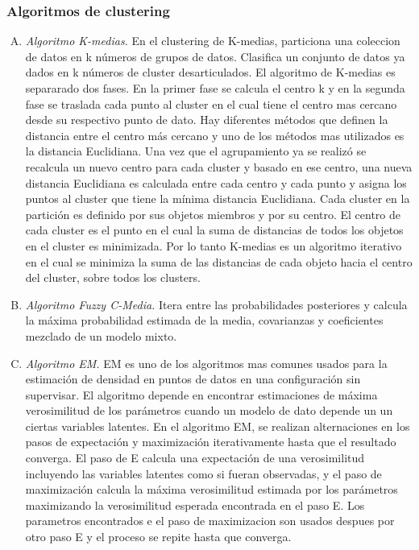 \documentclass[12pt]{report}
\begin{document}
\subsubsection{Algoritmos de clustering}
\begin{enumerate}[A.]
\item \textit{Algoritmo K-medias.} En el clustering de K-medias, particiona una coleccion de datos en k números de grupos de datos. Clasifica un conjunto de datos ya dados en k números de cluster desarticulados. El algoritmo de K-medias es separarado dos fases.
En la primer fase se calcula el centro k y en la segunda fase se traslada cada punto al cluster en el cual tiene el centro mas cercano desde su respectivo punto de dato. Hay diferentes métodos que definen la distancia entre el centro más cercano y uno de los métodos mas utilizados es la distancia Euclidiana. Una vez que el agrupamiento ya se realizó se recalcula un nuevo centro para cada cluster y basado en ese centro, una nueva distancia Euclidiana es calculada entre cada centro y cada punto y asigna los puntos al cluster que tiene la mínima distancia Euclidiana.
Cada cluster en la partición es definido por sus objetos miembros y por su centro. El centro de cada cluster es el punto en el cual la suma de distancias de todos los objetos en el cluster es minimizada. Por lo tanto K-medias es un algoritmo iterativo en el cual se minimiza la suma de las distancias de cada objeto hacia el centro del cluster, sobre todos los clusters.\cite{kmed}

\item \textit{Algoritmo Fuzzy C-Media.} Itera entre las probabilidades posteriores y calcula la máxima probabilidad estimada de la media, covarianzas y coeficientes mezclado de un modelo mixto.

\item \textit{Algoritmo EM.} EM es uno de los algoritmos mas comunes usados para la estimación de densidad en puntos de datos en una configuración sin supervisar. El algoritmo depende en encontrar estimaciones de máxima verosimilitud de los parámetros cuando un modelo de dato depende un un ciertas variables latentes. En el algoritmo EM, se realizan alternaciones en los pasos de expectación y maximización iterativamente hasta que el resultado converga. El paso de E calcula una expectación de una verosimilitud incluyendo las variables latentes como si fueran observadas, y el paso de maximización  calcula la máxima verosimilitud estimada por los parámetros maximizando la verosimilitud esperada encontrada en el paso E. Los parametros encontrados e el paso de maximizacion son usados despues por otro paso E y el proceso se repite hasta que converga.\cite{em}

\end{enumerate}
\end{document}
